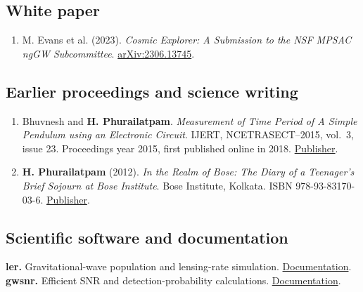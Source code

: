 \documentclass[11pt]{article}
\begin{document}
\subsection*{White paper}
\begin{enumerate}[start=13]
\item M. Evans et al. (2023). \textit{Cosmic Explorer: A Submission to the NSF MPSAC ngGW Subcommittee}. \href{https://arxiv.org/abs/2306.13745}{arXiv:2306.13745}.
\end{enumerate}

\subsection*{Earlier proceedings and science writing}
\begin{enumerate}[start=14]
\item Bhuvnesh and \textbf{H. Phurailatpam}. \textit{Measurement of Time Period of A Simple Pendulum using an Electronic Circuit}. IJERT, NCETRASECT--2015, vol.\ 3, issue 23. Proceedings year 2015, first published online in 2018. \href{https://www.ijert.org/measurement-of-time-period-of-a-simple-pendulum-using-an-electronic-circuit}{Publisher}.
\item \textbf{H. Phurailatpam} (2012). \textit{In the Realm of Bose: The Diary of a Teenager's Brief Sojourn at Bose Institute}. Bose Institute, Kolkata. ISBN 978-93-83170-03-6. \href{https://jcbose.ac.in/publication}{Publisher}.
\end{enumerate}
\subsection*{Scientific software and documentation}
\textbf{ler.} Gravitational-wave population and lensing-rate simulation. \href{https://ler.hemantaph.com/}{Documentation}.\\
\textbf{gwsnr.} Efficient SNR and detection-probability calculations. \href{https://gwsnr.hemantaph.com/}{Documentation}.
\end{document}
